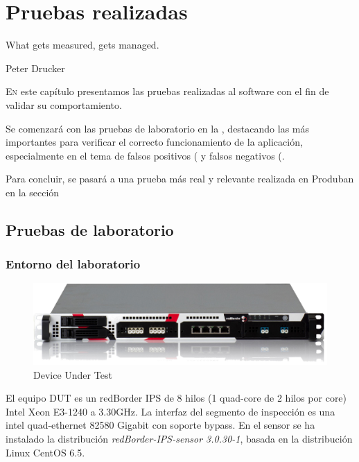 \chapter{Pruebas realizadas}
\pagestyle{esitscCD}

\epigraph{What gets measured, gets managed.}{Peter Drucker}

\lettrine[lraise=-0.1, lines=2, loversize=0.25]{E}n este capítulo presentamos las pruebas realizadas al software con el 
fin de validar su comportamiento.

Se comenzará con las pruebas de laboratorio en la , destacando las más importantes para 
verificar el correcto funcionamiento de la aplicación, especialmente en el tema de falsos positivos 
( y falsos negativos (.

Para concluir, se pasará a una prueba más real y relevante realizada en Produban en la sección 


\section{Pruebas de laboratorio}
\subsection{Entorno del laboratorio}

\begin{figure}[htbp]
\centering
\includegraphics[width=\textwidth]{CapituloPruebas/Figuras/Sensor}
\caption{Device Under Test}
\end{figure}
%

El equipo \gls{DUT} es un redBorder IPS de 8 hilos (1 quad-core de 2 hilos por core) Intel Xeon E3-1240 a 3.30GHz. La 
interfaz del segmento de inspección es una intel quad-ethernet 82580 Gigabit con soporte bypass. En el sensor se ha 
instalado la distribución \emph{redBorder-IPS-sensor 3.0.30-1}, basada en la distribución Linux CentOS 6.5.

